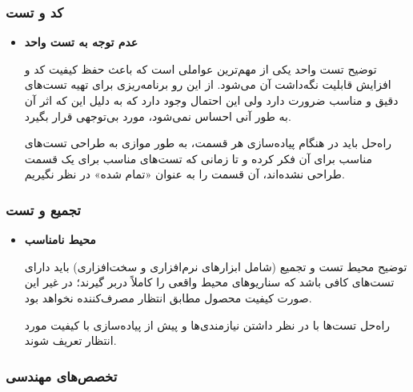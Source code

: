 \subsubsection{کد و تست}

\begin{itemize}
	
	\item 
	\textbf{عدم توجه به تست واحد}
	
	توضیح \hspace*{1cm} 
تست واحد یکی از مهم‌ترین عواملی است که باعث حفظ کیفیت کد و افزایش قابلیت نگه‌داشت آن می‌شود. از این رو برنامه‌ریزی برای تهیه تست‌های دقیق و مناسب ضرورت دارد ولی این احتمال وجود دارد که به دلیل این که اثر آن به طور آنی احساس نمی‌شود، مورد بی‌توجهی قرار بگیرد.
	
	راه‌حل \hspace*{1cm} 
باید در هنگام پیاده‌سازی هر قسمت، به طور موازی به طراحی تست‌های مناسب برای آن فکر کرده و تا زمانی که تست‌های مناسب برای یک قسمت طراحی نشده‌اند، آن قسمت را به عنوان «تمام شده»‌ در نظر نگیریم.
	
\end{itemize}

\subsubsection{تجمیع و تست}

\begin{itemize}
	
	\item 
	\textbf{محیط نامناسب}

	توضیح \hspace*{1cm} 
محیط تست و تجمیع (شامل ابزارهای نرم‌افزاری و سخت‌افزاری) باید دارای تست‌های کافی باشد که سناریوهای محیط واقعی را کاملاً دربر گیرند؛ در غیر این صورت کیفیت محصول مطابق انتظار مصرف‌کننده نخواهد بود.
	
	راه‌حل \hspace*{1cm} 
تست‌ها با در نظر داشتن نیازمندی‌ها و پیش از پیاده‌سازی با کیفیت مورد انتظار تعریف شوند.
		
\end{itemize}

\subsubsection{تخصص‌های مهندسی}

